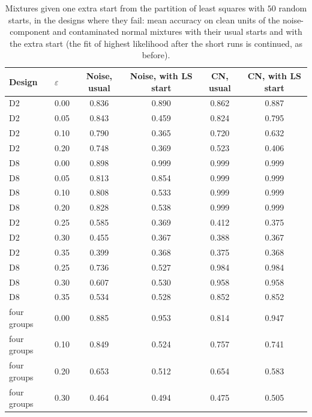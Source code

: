\begin{table}[htbp]
\centering
\small
\caption{Mixtures given one extra start from the partition of least squares with $50$ random starts, in the designs where they fail: mean accuracy on clean units of the noise-component and contaminated normal mixtures with their usual starts and with the extra start (the fit of highest likelihood after the short runs is continued, as before).}
\label{tab:S27}
\begin{tabular}{llcccc}
\toprule
Design & $\varepsilon$ & Noise, usual & Noise, with LS start & CN, usual & CN, with LS start \\
\midrule
D2 & 0.00 & 0.836 & 0.890 & 0.862 & 0.887 \\
D2 & 0.05 & 0.843 & 0.459 & 0.824 & 0.795 \\
D2 & 0.10 & 0.790 & 0.365 & 0.720 & 0.632 \\
D2 & 0.20 & 0.748 & 0.369 & 0.523 & 0.406 \\
D8 & 0.00 & 0.898 & 0.999 & 0.999 & 0.999 \\
D8 & 0.05 & 0.813 & 0.854 & 0.999 & 0.999 \\
D8 & 0.10 & 0.808 & 0.533 & 0.999 & 0.999 \\
D8 & 0.20 & 0.828 & 0.538 & 0.999 & 0.999 \\
D2 & 0.25 & 0.585 & 0.369 & 0.412 & 0.375 \\
D2 & 0.30 & 0.455 & 0.367 & 0.388 & 0.367 \\
D2 & 0.35 & 0.399 & 0.368 & 0.375 & 0.368 \\
D8 & 0.25 & 0.736 & 0.527 & 0.984 & 0.984 \\
D8 & 0.30 & 0.607 & 0.530 & 0.958 & 0.958 \\
D8 & 0.35 & 0.534 & 0.528 & 0.852 & 0.852 \\
four groups & 0.00 & 0.885 & 0.953 & 0.814 & 0.947 \\
four groups & 0.10 & 0.849 & 0.524 & 0.757 & 0.741 \\
four groups & 0.20 & 0.653 & 0.512 & 0.654 & 0.583 \\
four groups & 0.30 & 0.464 & 0.494 & 0.475 & 0.505 \\
\bottomrule
\end{tabular}
\end{table}